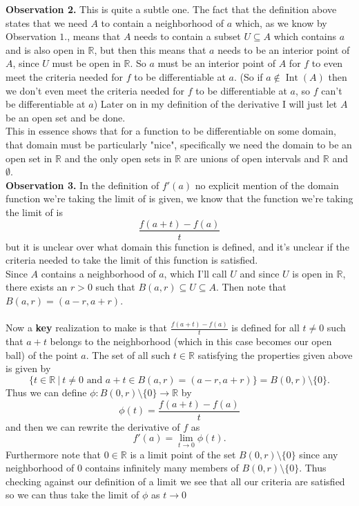 \documentclass[12pt]{article}
\theoremstyle{definition}
\numberwithin{definition}{subsection}
\numberwithin{theorem}{subsection}
\numberwithin{corollary}{subsection}
\numberwithin{example}{subsection}
\theoremstyle{remark}
\theoremstyle{point}
\begin{document}
	\textbf{Observation 2.} This is quite a subtle one. The fact that the definition above states that we need $A$ to contain a neighborhood of $a$ which, as we know by Observation $1.$, means that $A$ needs to contain a subset $U \subseteq A$ which contains $a$ and is also open in $\mathbb{R}$, but then this means that $a$ needs to be an interior point of $A$, since $U$ must be open in $\mathbb{R}$. So $a$ must be an interior point of $A$ for $f$ to even meet the criteria needed for $f$ to be differentiable at $a$. (So if $a\not\in \operatorname{Int}(A)$ then we don't even meet the criteria needed for $f$ to be differentiable at $a$, so $f$ can't be differentiable at $a$) Later on in my definition of the derivative I will just let $A$ be an open set and be done. \\
	
	This in essence shows that for a function to be differentiable on some domain, that domain must be particularly "nice", specifically we need the domain to be an open set in $\mathbb{R}$ and the only open sets in $\mathbb{R}$ are unions of open intervals and $\mathbb{R}$ and $\emptyset$. \\ 
		
	\textbf{Observation 3.} In the definition of $f'(a)$ no explicit mention of the domain function we're taking the limit of is given, we know that the function we're taking the limit of is $$\frac{f(a+t) - f(a)}{t}$$ but it is unclear over what domain this function is defined, and it's unclear if the criteria needed to take the limit of this function is satisfied. \\
	
	Since $A$ contains a neighborhood of $a$, which I'll call $U$ and since $U$ is open in $\mathbb{R}$, there exists an $r > 0$ such that $B(a, r) \subseteq U \subseteq A$.  Then note that $B(a, r) = (a-r, a+r)$. \\ \\ Now a \textbf{key} realization to make is that $\frac{f(a+t) - f(a)}{t}$ is defined for all $t \neq 0$ such that $a + t$ belongs to the neighborhood (which in this case becomes our open ball) of the point $a$. 
	The set of all such $t \in \mathbb{R}$ satisfying the properties given above is given by $$\{t \in \mathbb{R} \ | \  t\neq 0 \text{ and } a+t \in B(a, r) = (a-r, a+r)\} = B(0, r) \setminus \{0\}.$$ Thus we can define $\phi : B(0, r) \setminus \{0\} \to \mathbb{R}$ by $$\phi(t) = \frac{f(a+t) - f(a)}{t}$$ and then we can rewrite the derivative of $f$ as $$f'(a) = \lim_{t \to 0} \phi(t).$$ Furthermore note that $0 \in \mathbb{R}$ is a limit point of the set $B(0, r) \setminus \{0\}$ since any neighborhood of $0$ contains infinitely many members of $B(0, r) \setminus \{0\}$. Thus checking against our definition of a limit we see that all our criteria are satisfied so we can thus take the limit of $\phi$ as $t \to 0$\\
	
\end{document}
